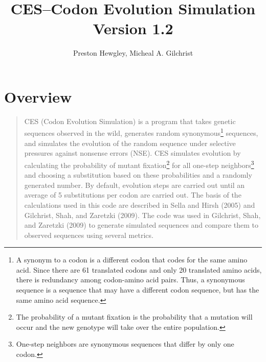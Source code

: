 \documentclass{article}
\title{\textbf{CES--Codon Evolution Simulation} \\ {\Large Version 1.2}}
\author{Preston Hewgley, Micheal A. Gilchrist}
\begin{document}
\addtolength{\topmargin}{-1cm}
\addtolength{\textheight}{1cm}
\maketitle


\section{Overview}
	\begin{quote}
		CES (Codon Evolution Simulation) is a program that takes genetic sequences observed in the wild,
		 generates random synonymous\footnote{A synonym to a codon is a different codon that codes for the same 
		 amino acid. Since there are 61 translated codons and only 20 translated amino acids, there is
		 redundancy among codon-amino acid pairs. Thus, a synonymous sequence is a sequence that may 
		 have a different codon sequence, but has the same amino acid sequence.} sequences, and simulates 
		 the evolution of the random sequence under selective pressures against nonsense errors (NSE). 
		 CES simulates evolution by calculating the probability of mutant fixation\footnote{The probability of 
		 a mutant fixation is the probability that a mutation will occur and the new genotype will take over
		 the entire population.} for all one-step neighbors\footnote{One-step neighbors are synonymous
		 sequences that differ by only one codon.} and choosing a substitution based on these probabilities and a 
		 randomly generated number. By default, evolution steps are carried out until an average
		 of 5 substitutions per codon are carried out. The basis of the calculations used in this code are described in 
		 Sella and Hirsh (2005) and Gilchrist, Shah, and Zaretzki (2009). The code was used in Gilchrist,
		 Shah, and Zaretzki (2009) to generate simulated sequences and compare them to observed sequences
		 using several metrics. 

	\end{quote}

	
\end{document}
